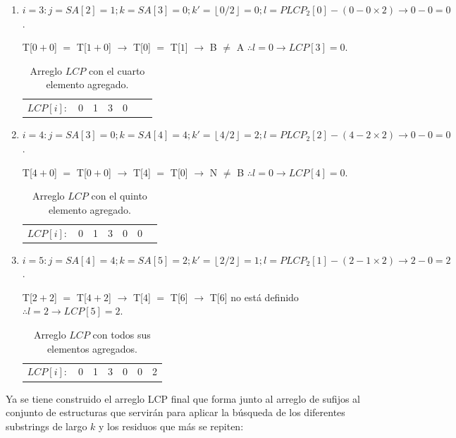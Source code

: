 \begin{enumerate}
\item $i=3: j=SA[2]=1; k=SA[3]=0; k'= \left \lfloor{0/2}\right \rfloor = 0; l= PLCP_{2}[0] - (0-0 \times 2) \rightarrow 0-0=0$.

T[$0+0$] $=$ T[$1+0$] $\rightarrow$ T[$0$] $=$ T[$1$] $\rightarrow$ B $\neq$ A $\therefore l=0 \rightarrow LCP[3] = 0$.

\begin{table}[!htb]
\centering
\begin{tabular}{c|c|c|c|c|c|c|}
\cline{2-7}
$LCP[i]:$ & 0 & 1 & 3 & 0 &  & \\ \cline{2-7}
\end{tabular}
\caption{Arreglo $LCP$ con el cuarto elemento agregado.}
\end{table}

\item $i=4: j=SA[3]=0; k=SA[4]=4; k'= \left \lfloor{4/2}\right \rfloor = 2; l= PLCP_{2}[2] - (4-2 \times 2) \rightarrow 0-0=0$.

T[$4+0$] $=$ T[$0+0$] $\rightarrow$ T[$4$] $=$ T[$0$] $\rightarrow$ N $\neq$ B $\therefore l=0 \rightarrow LCP[4] = 0$.

\begin{table}[!htb]
\centering
\begin{tabular}{c|c|c|c|c|c|c|}
\cline{2-7}
$LCP[i]:$ & 0 & 1 & 3 & 0 & 0 & \\ \cline{2-7}
\end{tabular}
\caption{Arreglo $LCP$ con el quinto elemento agregado.}
\end{table}

\item $i=5: j=SA[4]=4; k=SA[5]=2; k'= \left \lfloor{2/2}\right \rfloor = 1; l= PLCP_{2}[1] - (2-1 \times 2) \rightarrow 2-0=2$.

T[$2+2$] $=$ T[$4+2$] $\rightarrow$ T[$4$] $=$ T[$6$] $\rightarrow$ T[$6$] no está definido $\therefore l=2 \rightarrow LCP[5] = 2$.

\begin{table}[!htb]
\centering
\begin{tabular}{c|c|c|c|c|c|c|}
\cline{2-7}
$LCP[i]:$ & 0 & 1 & 3 & 0 & 0 & 2 \\ \cline{2-7}
\end{tabular}
\caption{Arreglo $LCP$ con todos sus elementos agregados.}
\end{table}

\end{enumerate}

Ya se tiene construido el arreglo LCP final que forma junto al arreglo de sufijos al conjunto de estructuras que servirán para aplicar la búsqueda de los diferentes substrings de largo $k$ y los residuos que más se repiten:

